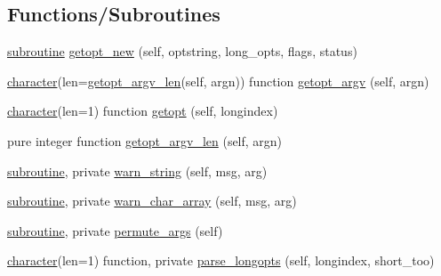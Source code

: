 \subsection*{Functions/\+Subroutines}
\begin{DoxyCompactItemize}
\item 
\hyperlink{M__stopwatch_83_8txt_acfbcff50169d691ff02d4a123ed70482}{subroutine} \hyperlink{namespacem__getopt__long_af5aeba1b29425c5da2db9113aac0dc97}{getopt\+\_\+new} (self, optstring, long\+\_\+opts, flags, status)
\item 
\hyperlink{option__stopwatch_83_8txt_abd4b21fbbd175834027b5224bfe97e66}{character}(len=\hyperlink{namespacem__getopt__long_a379b13093de969a83f29283c3cce3c7a}{getopt\+\_\+argv\+\_\+len}(self, argn)) function \hyperlink{namespacem__getopt__long_a7bd7b84d1aeda27b57f33b81a93ef1c1}{getopt\+\_\+argv} (self, argn)
\item 
\hyperlink{option__stopwatch_83_8txt_abd4b21fbbd175834027b5224bfe97e66}{character}(len=1) function \hyperlink{namespacem__getopt__long_ae12838b4ea1d076090a8bbd9f05000ef}{getopt} (self, longindex)
\item 
pure integer function \hyperlink{namespacem__getopt__long_a379b13093de969a83f29283c3cce3c7a}{getopt\+\_\+argv\+\_\+len} (self, argn)
\item 
\hyperlink{M__stopwatch_83_8txt_acfbcff50169d691ff02d4a123ed70482}{subroutine}, private \hyperlink{namespacem__getopt__long_a78f4dacb7eae96d7e259544003ae0dfd}{warn\+\_\+string} (self, msg, arg)
\item 
\hyperlink{M__stopwatch_83_8txt_acfbcff50169d691ff02d4a123ed70482}{subroutine}, private \hyperlink{namespacem__getopt__long_af1ccef432aa194687e03575a68537553}{warn\+\_\+char\+\_\+array} (self, msg, arg)
\item 
\hyperlink{M__stopwatch_83_8txt_acfbcff50169d691ff02d4a123ed70482}{subroutine}, private \hyperlink{namespacem__getopt__long_a55045492836fd218379126cbdcee24ea}{permute\+\_\+args} (self)
\item 
\hyperlink{option__stopwatch_83_8txt_abd4b21fbbd175834027b5224bfe97e66}{character}(len=1) function, private \hyperlink{namespacem__getopt__long_a7bad6d8d4067d578429da9282bc82ada}{parse\+\_\+longopts} (self, longindex, short\+\_\+too)
\end{DoxyCompactItemize}
